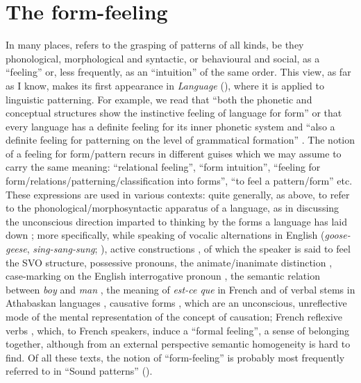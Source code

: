 \documentclass[output=paper]{langscibook}
\begin{document}
\section{The form-feeling}
\label{sec:fortis:form-feeling}

In many places, {\Sapir} refers to the grasping of patterns of all kinds, be they phonological, morphological and syntactic, or behavioural and social, as a ``feeling'' or, less frequently, as an ``intuition'' of the same order. This view, as far as I know, makes its first appearance in \emph{Language} (\citeyear{Sapir1921}), where it is applied to linguistic patterning. For example, we read that ``both the phonetic and conceptual structures show the instinctive feeling of language for form'' \citep[56]{Sapir1921} or that every language has a definite feeling for its inner phonetic system and ``also a definite feeling for patterning on the level of grammatical formation'' \citep[61]{Sapir1921}. The notion of a feeling for form/pattern recurs in different guises which we may assume to carry the same meaning: ``relational feeling'', ``form intuition'', ``feeling for form/relations/patterning/classification into forms'', ``to feel a pattern/form'' etc. These expressions are used in various contexts: quite generally, as above, to refer to the phonological/morphosyntactic apparatus of a language, as in discussing the unconscious direction imparted to thinking by the forms a language has laid down \citep[153]{Sapir1924}; more specifically, while speaking of vocalic alternations in English (\emph{goose-geese}, \emph{sing-sang-sung}; \citealt[60--61]{Sapir1921}), active constructions \citep[84--85, 111]{Sapir1921}, of which the speaker is said to feel the SVO structure, possessive pronouns, the animate/inanimate distinction \citep[156]{Sapir1921}, case-marking on the English interrogative pronoun \citep[159]{Sapir1921}, the semantic relation between \emph{boy} and \emph{man} \citep[61]{Sapir1929b}, the meaning of \emph{est-ce que} in French and of verbal stems in Athabaskan languages \citep[147]{Sapir1923}, causative forms \citep[154]{Sapir1924}, which are an unconscious, unreflective mode of the mental representation of the concept of causation;  French reflexive verbs \citep[116]{Sapir1931}, which, to French speakers, induce a ``formal feeling'', a sense of belonging together, although from an external perspective semantic homogeneity is hard to find. Of all these texts, the notion of ``form-feeling'' is probably most frequently referred to in ``Sound patterns'' (\citeyear{Sapir1925}).
\end{document}
